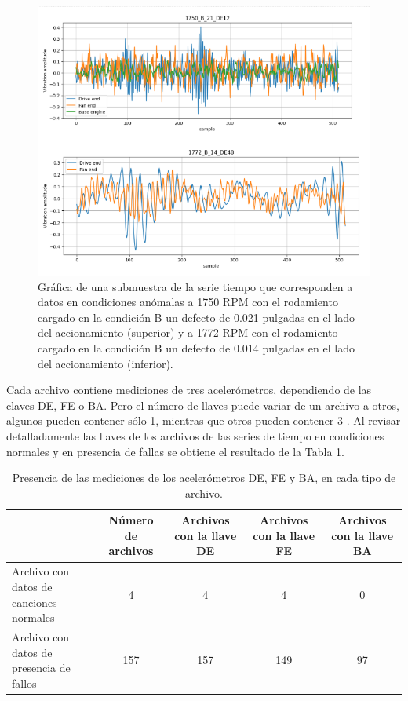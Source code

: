 \documentclass[11pt,a4paper,spanish]{book}
\numberwithin{equation}{chapter}
\numberwithin{figure}{chapter}
\begin{document}
\begin{figure}[h]
    \centering
    \includegraphics[width=1\textwidth]{media/dataset/anomaly-series.png}
    \caption{Gráfica de una submuestra de la serie tiempo que corresponden a datos en condiciones anómalas a 1750 RPM con el rodamiento cargado en la condición B un defecto de 0.021 pulgadas en el lado del accionamiento (superior) y a 1772 RPM con el rodamiento cargado en la condición B un defecto de 0.014 pulgadas en el lado del accionamiento (inferior). }
    \label{fig:figAnomalySeries}
\end{figure}


Cada archivo contiene mediciones de tres acelerómetros, dependiendo de las claves DE, FE o BA. Pero el número de llaves puede variar de un archivo a otros, algunos pueden contener sólo 1, mientras que otros pueden contener 3 \cite{rigas2024marine}. Al revisar detalladamente las llaves de los archivos de las series de tiempo en condiciones normales y en presencia de fallas  se obtiene el resultado de la Tabla 1. 


\begin{table}[h]
\centering
\renewcommand{\arraystretch}{1.5} %
\begin{tabular}{|p{3cm}|c|c|c|c|}
    \hline
    \textbf{} & 
    \textbf{Número de archivos} & 
    \textbf{Archivos con la llave DE} & 
    \textbf{Archivos con la llave FE} & 
    \textbf{Archivos con la llave BA} \\
    \hline
    Archivo con datos de canciones normales & 4 & 4 & 4 & 0 \\
    \hline
    Archivo con datos de presencia de fallos & 157 & 157 & 149 & 97 \\
    \hline
\end{tabular}
\caption{Presencia de las mediciones de los acelerómetros DE, FE y BA, en cada tipo de archivo.}
\label{tab:tab1keys}
\end{table}
\end{document}

